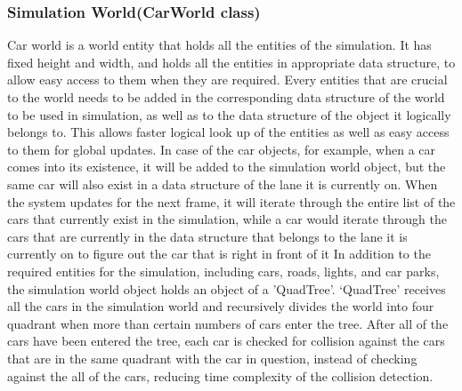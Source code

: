 \documentclass[11pt]{article}
\begin{document}
\subsubsection{Simulation World(CarWorld class)}
Car world is a world entity that holds all the entities of the simulation. It has fixed height and width, and holds all the entities in appropriate data structure, to allow easy access to them when they are required. Every entities that are crucial to the world needs to be added in the corresponding data structure of the world to be used in simulation, as well as to the data structure of the object it logically belongs to. This allows faster logical look up of the entities as well as easy access to them for global updates. In case of the car objects, for example, when a car comes into its existence, it will be added to the simulation world object, but the same car will also exist in a data structure of the lane it is currently on. When the system updates for the next frame, it will iterate through the entire list of the cars that currently exist in the simulation, while a car would iterate through the cars that are currently in the data structure that belongs to the lane it is currently on to figure out the car that is right in front of it
 In addition to the required entities for the simulation, including cars, roads, lights, and car parks, the simulation world object holds an object of a 'QuadTree'. ‘QuadTree’ receives all the cars in the simulation world and recursively divides the world into four quadrant when more than certain numbers of cars enter the tree. After all of the cars have been entered the tree, each car is checked for collision against the cars that are in the same quadrant with the car in question, instead of checking against the all of the cars, reducing time complexity of the collision detection.
\end{document}
